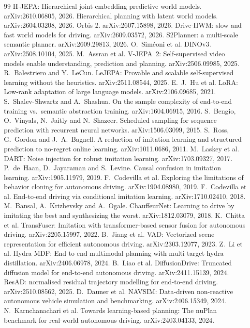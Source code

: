 \documentclass[10pt,twocolumn]{article}
\theoremstyle{remark}
\begin{document}
\begin{thebibliography}{99}\footnotesize\setlength{\itemsep}{0.5pt}\setlength{\parsep}{0pt}
 H-JEPA: Hierarchical joint-embedding predictive world models. arXiv:2610.06805, 2026.
 Hierarchical planning with latent world models. arXiv:2604.03208, 2026.
 Orbis 2. arXiv:2607.15898, 2026.
 Drive-HWM: slow and fast world models for driving. arXiv:2609.03572, 2026.
 S2Planner: a multi-scale semantic planner. arXiv:2609.29813, 2026.
 O.~Sim\'eoni et al. DINOv3. arXiv:2508.10104, 2025.
 M.~Assran et al. V-JEPA~2: Self-supervised video models enable understanding, prediction and planning. arXiv:2506.09985, 2025.
 R.~Balestriero and Y.~LeCun. LeJEPA: Provable and scalable self-supervised learning without the heuristics. arXiv:2511.08544, 2025.
 E.~J.~Hu et al. LoRA: Low-rank adaptation of large language models. arXiv:2106.09685, 2021.
 S.~Shalev-Shwartz and A.~Shashua. On the sample complexity of end-to-end training vs.\ semantic abstraction training. arXiv:1604.06915, 2016.
 S.~Bengio, O.~Vinyals, N.~Jaitly and N.~Shazeer. Scheduled sampling for sequence prediction with recurrent neural networks. arXiv:1506.03099, 2015.
 S.~Ross, G.~Gordon and J.~A.~Bagnell. A reduction of imitation learning and structured prediction to no-regret online learning. arXiv:1011.0686, 2011.
 M.~Laskey et al. DART: Noise injection for robust imitation learning. arXiv:1703.09327, 2017.
 P.~de~Haan, D.~Jayaraman and S.~Levine. Causal confusion in imitation learning. arXiv:1905.11979, 2019.
 F.~Codevilla et al. Exploring the limitations of behavior cloning for autonomous driving. arXiv:1904.08980, 2019.
 F.~Codevilla et al. End-to-end driving via conditional imitation learning. arXiv:1710.02410, 2018.
 M.~Bansal, A.~Krizhevsky and A.~Ogale. ChauffeurNet: Learning to drive by imitating the best and synthesizing the worst. arXiv:1812.03079, 2018.
 K.~Chitta et al. TransFuser: Imitation with transformer-based sensor fusion for autonomous driving. arXiv:2205.15997, 2022.
 B.~Jiang et al. VAD: Vectorized scene representation for efficient autonomous driving. arXiv:2303.12077, 2023.
 Z.~Li et al. Hydra-MDP: End-to-end multimodal planning with multi-target hydra-distillation. arXiv:2406.06978, 2024.
 B.~Liao et al. DiffusionDrive: Truncated diffusion model for end-to-end autonomous driving. arXiv:2411.15139, 2024.
 ResAD: normalised residual trajectory modelling for end-to-end driving. arXiv:2510.08562, 2025.
 D.~Dauner et al. NAVSIM: Data-driven non-reactive autonomous vehicle simulation and benchmarking. arXiv:2406.15349, 2024.
 N.~Karnchanachari et al. Towards learning-based planning: The nuPlan benchmark for real-world autonomous driving. arXiv:2403.04133, 2024.
\end{thebibliography}
\end{document}
